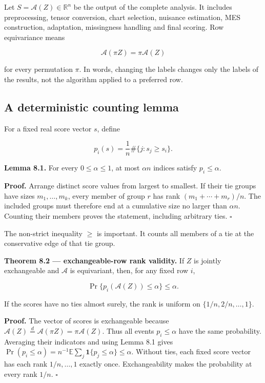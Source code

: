 \documentclass[
  11pt,
  a4paper]{article}
\begin{document}
Let \(S=\mathcal A(Z)\in\mathbb R^n\) be the output of the complete analysis. It includes preprocessing, tensor conversion, chart selection, nuisance estimation, MES construction, adaptation, missingness handling and final scoring. Row equivariance means

\[
\mathcal A(\pi Z)=\pi\mathcal A(Z)
\tag{8.1}
\]

for every permutation \(\pi\). In words, changing the labels changes only the labels of the results, not the algorithm applied to a preferred row.

\hypertarget{a-deterministic-counting-lemma}{%
\subsection{A deterministic counting lemma}\label{a-deterministic-counting-lemma}}

For a fixed real score vector \(s\), define

\[
p_i(s)=\frac1n\#\{j:s_j\ge s_i\}.
\tag{8.2}
\]

\textbf{Lemma 8.1.} For every \(0\le\alpha\le1\), at most \(\alpha n\) indices satisfy \(p_i\le\alpha\).

\textbf{Proof.} Arrange distinct score values from largest to smallest. If their tie groups have sizes \(m_1,\ldots,m_k\), every member of group \(r\) has rank \((m_1+\cdots+m_r)/n\). The included groups must therefore end at a cumulative size no larger than \(\alpha n\). Counting their members proves the statement, including arbitrary ties. \(\square\)

The non-strict inequality \(\ge\) is important. It counts all members of a tie at the conservative edge of that tie group.

\textbf{Theorem 8.2 --- exchangeable-row rank validity.} If \(Z\) is jointly exchangeable and \(\mathcal A\) is equivariant, then, for any fixed row \(i\),

\[
\Pr\{p_i(\mathcal A(Z))\le\alpha\}\le\alpha.
\tag{8.3}
\]

If the scores have no ties almost surely, the rank is uniform on \(\{1/n,2/n,\ldots,1\}\).

\textbf{Proof.} The vector of scores is exchangeable because
\(\mathcal A(Z)\overset d=\mathcal A(\pi Z)=\pi\mathcal A(Z)\).
Thus all events \(p_i\le\alpha\) have the same probability. Averaging their indicators and using Lemma 8.1 gives
\(\Pr(p_i\le\alpha)=n^{-1}\mathbb E\sum_j\mathbf1\{p_j\le\alpha\}\le\alpha\).
Without ties, each fixed score vector has each rank \(1/n,\ldots,1\) exactly once. Exchangeability makes the probability at every rank \(1/n\). \(\square\)
\end{document}
